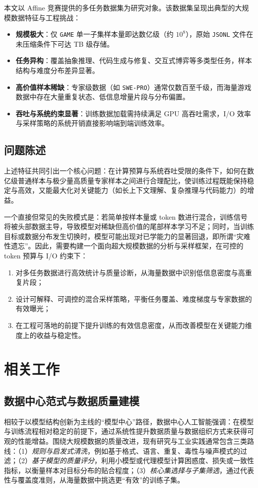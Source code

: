 \documentclass[UTF8]{article}
\begin{document}
本文以 Affine 竞赛提供的多任务数据集为研究对象。该数据集呈现出典型的大规模数据特征与工程挑战：
\begin{itemize}
    \item \textbf{规模极大}：仅 \texttt{GAME} 单一子集样本量即达数亿级（约 $10^8$），原始 \texttt{JSONL} 文件在未压缩条件下可达 TB 级存储。
    \item \textbf{任务异构}：覆盖抽象推理、代码生成与修复、交互式博弈等多类型任务，样本结构与难度分布差异显著。
    \item \textbf{高价值样本稀缺}：专家级数据（如 \texttt{SWE-PRO}）通常仅数百至千级，而海量游戏数据中存在大量重复状态、低信息增量片段与分布偏置。
    \item \textbf{吞吐与系统约束显著}：训练数据加载需持续满足 GPU 高吞吐需求，I/O 效率与采样策略的系统开销直接影响端到端训练效率。
\end{itemize}

\subsection{问题陈述}
上述特征共同引出一个核心问题：在计算预算与系统吞吐受限的条件下，如何在数亿级普通样本与极少量高质量专家样本之间进行合理配比，使训练过程既能保持稳定与高效，又能最大化对关键能力（如长上下文理解、复杂推理与代码能力）的增益。

一个直接但常见的失败模式是：若简单按样本量或 token 数进行混合，训练信号将被头部数据主导，导致模型对稀缺但高价值的尾部样本学习不足；同时，当训练目标或数据分布发生切换时，模型可能出现对已学能力的显著回退，即所谓“灾难性遗忘”。因此，需要构建一个面向超大规模数据的分析与采样框架，在可控的 token 预算与 I/O 约束下：
\begin{enumerate}
    \item 对多任务数据进行高效统计与质量诊断，从海量数据中识别低信息密度与高重复片段；
    \item 设计可解释、可调控的混合采样策略，平衡任务覆盖、难度梯度与专家数据的有效曝光；
    \item 在工程可落地的前提下提升训练的有效信息密度，从而改善模型在关键能力维度上的收益与稳定性。
\end{enumerate}

\section{相关工作}\label{sec:related_work}

\subsection{数据中心范式与数据质量建模}
相较于以模型结构创新为主线的“模型中心”路径，数据中心人工智能强调：在模型与训练流程相对稳定的前提下，通过系统性提升数据质量与数据组织方式来获得可观的性能增益。围绕大规模数据的质量改进，现有研究与工业实践通常包含三类路线：（1）\emph{规则与启发式清洗}，例如基于格式、语言、重复、毒性与噪声模式的过滤；（2）\emph{基于模型的质量评分}，利用小模型或代理模型计算困惑度、损失或一致性指标，以衡量样本对目标分布的贴合程度；（3）\emph{核心集选择与子集筛选}，通过代表性与覆盖度准则，从海量数据中挑选更“有效”的训练子集。
\end{document}
